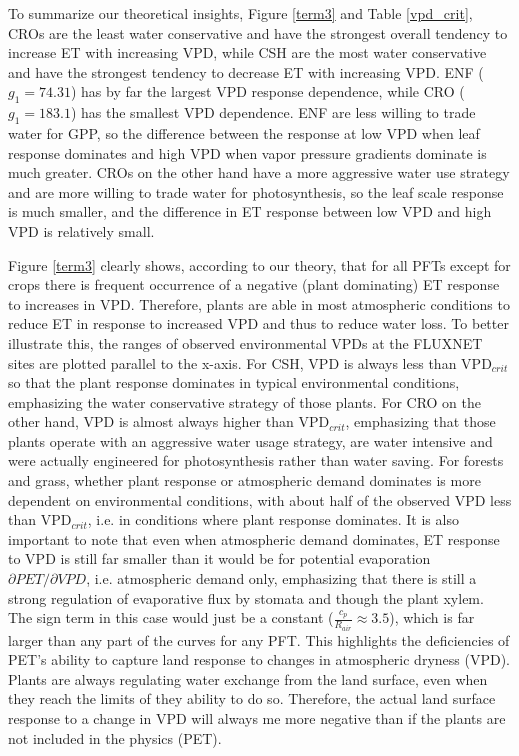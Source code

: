 \documentclass[draft,linenumbers]{gcbjournal}
\begin{document}
To summarize our theoretical insights, Figure \ref{term3} and Table \ref{vpd_crit}, CROs are the least water conservative and have the strongest overall tendency to increase ET with increasing VPD, while CSH are the most water conservative and have the strongest tendency to decrease ET with increasing VPD.  ENF ($g_1 = 74.31$) has by far the largest VPD response dependence, while CRO ($g_1 = 183.1$) has the smallest VPD dependence. ENF are less willing to trade water for GPP, so the difference between the response at low VPD when leaf response dominates and high VPD when vapor pressure gradients dominate is much greater. CROs on the other hand have a more aggressive water use strategy and are more willing to trade water for photosynthesis, so the leaf scale response is much smaller, and the difference in ET response between low VPD and high VPD is relatively small.

Figure \ref{term3} clearly shows, according to our theory, that for all PFTs except for crops there is frequent occurrence of a negative (plant dominating) ET response to increases in VPD. Therefore, plants are able in most atmospheric conditions to reduce ET in response to increased VPD and thus to reduce water loss. To better illustrate this, the ranges of observed environmental VPDs at the FLUXNET sites are plotted parallel to the x-axis. For CSH, VPD is always less than VPD$_{crit}$ so that the plant response dominates in typical environmental conditions, emphasizing the water conservative strategy of those plants. For CRO on the other hand, VPD is almost always higher than VPD$_{crit}$, emphasizing that those plants operate with an aggressive water usage strategy, are water intensive and were actually engineered for photosynthesis rather than water saving. For forests and grass, whether plant response or atmospheric demand dominates is more dependent on environmental conditions, with about half of the observed VPD less than VPD$_{crit}$, i.e. in conditions where plant response dominates. It is also important to note that even when atmospheric demand dominates, ET response to VPD is still far smaller than it would be for potential evaporation $\partial PET/\partial VPD$, i.e. atmospheric demand only, emphasizing that there is still a strong regulation of evaporative flux by stomata and though the plant xylem. The sign term in this case would just be a constant ($\frac{c_p}{R_{air}} \approx 3.5$), which is far larger than any part of the curves for any PFT. This highlights the deficiencies of PET's ability to capture land response to changes in atmospheric dryness (VPD). Plants are always regulating water exchange from the land surface, even when they reach the limits of they ability to do so. Therefore, the actual land surface response to a change in VPD will always me more negative than if the plants are not included in the physics (PET). 
\end{document}
